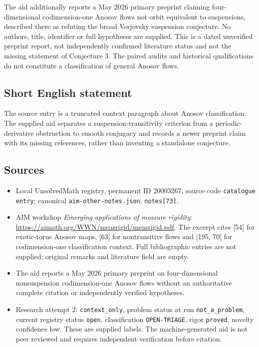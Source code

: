 \documentclass[11pt]{article}
\begin{document}
The aid additionally reports a May 2026 primary preprint claiming four-dimensional codimension-one Anosov flows not orbit equivalent to suspensions, described there as refuting the broad Verjovsky suspension conjecture. No authors, title, identifier or full hypotheses are supplied. This is a dated unverified preprint report, not independently confirmed literature status and not the missing statement of Conjecture 3. The paired audits and historical qualifications do not constitute a classification of general Anosov flows.
\subsection{Short English statement}
The source entry is a truncated context paragraph about Anosov classification. The supplied aid separates a suspension-transitivity criterion from a periodic-derivative obstruction to smooth conjugacy and records a newer preprint claim with its missing references, rather than inventing a standalone conjecture.
\subsection{Sources}
\begin{itemize}
\item Local UnsolvedMath registry, permanent ID $20003267$, source code \texttt{catalogue entry}; canonical \texttt{aim-other-notes.json}, \texttt{notes[73]}.
\item AIM workshop \emph{Emerging applications of measure rigidity}: \url{https://aimath.org/WWN/measrigid/measrigid.pdf}. The excerpt cites [54] for exotic-torus Anosov maps, [63] for nontransitive flows and [195, 70] for codimension-one classification context. Full bibliographic entries are not supplied; original remarks and literature field are empty.
\item The aid reports a May 2026 primary preprint on four-dimensional nonsuspension codimension-one Anosov flows without an authoritative complete citation or independently verified hypotheses.
\item Research attempt 2: \texttt{context\_only}, problem status at run \texttt{not\_a\_problem}, current registry status \texttt{open}, classification \texttt{OPEN-TRIAGE}, rigor \texttt{proved}, novelty confidence low. These are supplied labels. The machine-generated aid is not peer reviewed and requires independent verification before citation.
\end{itemize}
\end{document}
